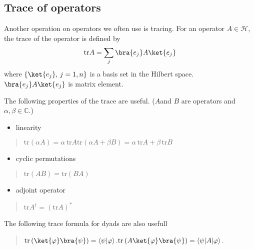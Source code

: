 \documentclass[letterpaper,10pt,english]{jupyterBook}
\begin{document}
\subsection{Trace of operators}
\label{\detokenize{qmsummary/operators:trace-of-operators}}
\sphinxAtStartPar
Another operation on operators we often use is tracing.   For an operator \(A \in \mathcal{H}\), the trace of the operator is defined by
\begin{equation*}
\begin{split}
\text{tr} A = \sum_j  \bra{e_j} A  \ket{e_j}
\end{split}
\end{equation*}
\sphinxAtStartPar
where \(\{\ket{e_j}, \, j=1,n\}\) is a basis set in the Hilbert space.  \(\bra{e_j} A  \ket{e_j}\) is matrix element.

\sphinxAtStartPar
The following properties of the trace are useful.  (\(A\)and \(B\) are operators and \(\alpha, \beta \in \mathbb{C}\).)
\begin{itemize}
\item {}
\sphinxAtStartPar
linearity

\end{itemize}
\begin{quote}

\sphinxAtStartPar
\(\text{tr}\left(\alpha A\right) = \alpha\, \text{tr} A\)\(\text{tr} \left(\alpha A+\beta B\right) = \alpha\, \text{tr} A + \beta\, \text{tr} B\)
\end{quote}
\begin{itemize}
\item {}
\sphinxAtStartPar
cyclic permutations

\end{itemize}
\begin{quote}

\sphinxAtStartPar
\(\text{tr}\left(AB\right) = \text{tr}\left(BA\right)\)
\end{quote}
\begin{itemize}
\item {}
\sphinxAtStartPar
adjoint operator

\end{itemize}
\begin{quote}

\sphinxAtStartPar
\(\text{tr} A^\dagger = (\text{tr} A)^*\)
\end{quote}

\sphinxAtStartPar
The following trace formula for dyads are also usefull
\begin{quote}

\sphinxAtStartPar
\(\text{tr}\left(\ket{\varphi}\bra{\psi}\right) = \langle\psi|\varphi\rangle\).\(\text{tr}\left(A\ket{\varphi}\bra{\psi}\right) = \langle\psi|A|\varphi\rangle\).
\end{quote}
\end{document}
